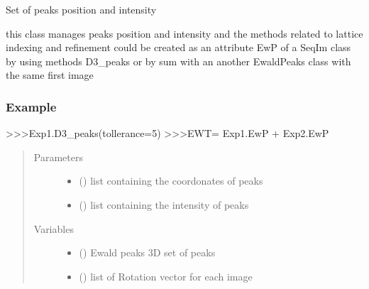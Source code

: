 \documentclass[letterpaper,10pt,english]{sphinxmanual}
\begin{document}
\begin{fulllineitems}
\label{\detokenize{index:TEMpcPlot.EwaldPeaks}}
Set of peaks position and intensity

this class manages peaks position and intensity and the methods related to
lattice indexing and refinement
could be created as an attribute EwP of a SeqIm class by using methods D3\_peaks
or by sum with an another EwaldPeaks class with the same first image
\subsubsection*{Example}

\textgreater{}\textgreater{}\textgreater{}Exp1.D3\_peaks(tollerance=5)
\textgreater{}\textgreater{}\textgreater{}EWT= Exp1.EwP +  Exp2.EwP
\begin{quote}\begin{description}
\item[{Parameters}] \leavevmode\begin{itemize}
\item {} 
 () \textendash{} list containing the coordonates of peaks

\item {} 
 () \textendash{} list containing the intensity of peaks

\end{itemize}

\item[{Variables}] \leavevmode\begin{itemize}
\item {} 
 () \textendash{} Ewald peaks 3D set of peaks

\item {} 
 () \textendash{} list of Rotation vector for each image


\end{itemize}
\end{description}
\end{quote}
\end{fulllineitems}
\end{document}
